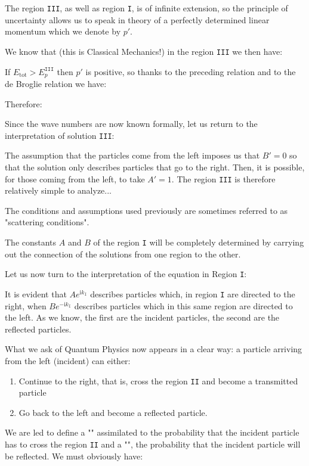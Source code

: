 	The region \texttt{III}, as well as region \texttt{I}, is of infinite extension, so the principle of uncertainty allows us to speak in theory of a perfectly determined linear momentum which we denote by $p'$.

	We know that (this is Classical Mechanics!) in the region \texttt{III} we then have:
	
	If $E_\text{tot}>E_p^{\texttt{III}}$ then $p'$ is positive, so thanks to the preceding relation and to the de Broglie relation we have:
	
	Therefore:
	
	Since the wave numbers are now known formally, let us return to the interpretation of solution \texttt{III}:
	
	The assumption that the particles come from the left imposes us that $B'=0$ so that the solution only describes particles that go to the right. Then, it is possible, for those coming from the left, to take $A'=1$. The region \texttt{III} is therefore relatively simple to analyze...
	
	\begin{tcolorbox}[title=Remark,colframe=black,arc=10pt]
	The conditions and assumptions used previously are sometimes referred to as "scattering conditions".
	\end{tcolorbox}
	The constants $A$ and $B$ of the region \texttt{I} will be completely determined by carrying out the connection of the solutions from one region to the other.

	Let us now turn to the interpretation of the equation in Region \texttt{I}:
	
	It is evident that $Ae^{\mathrm{i}k_{\texttt{I}}}$ describes particles which, in region \texttt{I} are directed to the right, when $Be^{-\mathrm{i}k_{\texttt{I}}}$ describes particles which in this same region are directed to the left. As we know, the first are the incident particles, the second are the reflected particles.
	
	What we ask of Quantum Physics now appears in a clear way: a particle arriving from the left (incident) can either:
	\begin{enumerate}
		\item Continue to the right, that is, cross the region \texttt{II} and become a transmitted particle

		\item Go back to the left and become a reflected particle.
	\end{enumerate}
	We are led to define a ""  assimilated to the probability that the incident particle has to cross the region \texttt{II} and a "", the probability that the incident particle will be reflected. We must obviously have:
	
